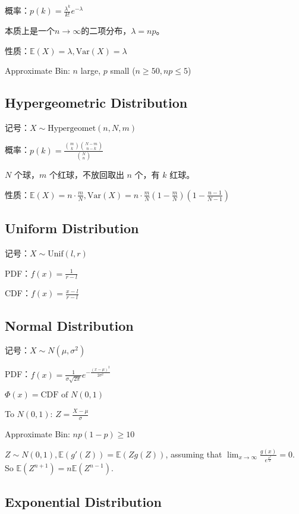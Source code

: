 \documentclass[9pt,landscape]{article}
\begin{document}
\begin{multicols}{3}
概率：$p(k)=\frac{\lambda^k}{k!}e^{-\lambda}$

本质上是一个$n\to\infty$的二项分布，$\lambda=np$。

性质：$\mathbb{E}(X)=\lambda,\text{Var}(X)=\lambda$

Approximate Bin: $n$ large, $p$ small ($n \ge 50, np \le 5$)

\subsection{Hypergeometric Distribution}

记号：$X \sim \text{Hypergeomet}(n, N, m)$

概率：$p(k)=\frac{\binom{m}{k}\binom{N-m}{n-k}}{\binom{N}{n}}$

$N$ 个球，$m$ 个红球，不放回取出 $n$ 个，有 $k$ 红球。

性质：$\mathbb{E}(X)=n\cdot\frac{m}{N}, \mathrm{Var}(X)=n\cdot \frac{m}{N}\left(1-\frac{m}{N}\right)\left(1-\frac{n-1}{N-1}\right)$

\subsection{Uniform Distribution}

记号：$X \sim \mathrm{Unif}(l, r)$

PDF：$f(x)=\frac{1}{r-l}$

CDF：$f(x)=\frac{x-l}{r-l}$

\subsection{Normal Distribution}

记号：$X \sim N\left(\mu, \sigma^2\right)$

PDF：$f(x)=\frac{1}{\sigma\sqrt{2\pi}}e^{-\frac{\left(x-\mu\right)^2}{2\sigma^2}}$

$\Phi(x)=\text{CDF of $N(0, 1)$}$

To $N(0, 1)$: $Z = \frac{X - \mu}{\sigma}$

Approximate Bin: $np(1-p)\ge 10$

$Z\sim N(0, 1), \mathbb{E}(g'(Z))=\mathbb{E}(Zg(Z))$,  assuming that $\lim_{x\to \infty}\frac{g(x)}{e^{\frac{x^2}{2}}}=0$. So $\mathbb{E}(Z^{n+1})=n\mathbb{E}(Z^{n-1})$.

\subsection{Exponential Distribution}


\end{multicols}
\end{document}
